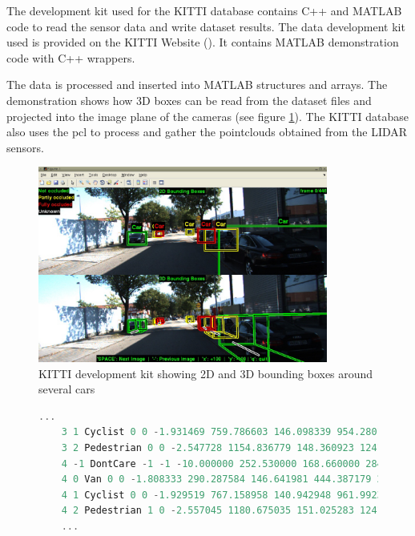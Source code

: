 The development kit used for the KITTI database contains C++ and MATLAB code to read the sensor data and write dataset results. The data development kit used is provided on the KITTI Website (\cite{KarlsruheInstituteofTechnology}). It contains MATLAB demonstration code with C++ wrappers. 

The data is processed and inserted into MATLAB structures and arrays. The demonstration shows how 3D boxes can be read from the dataset files and projected into the image plane of the cameras (see figure \ref{fig:kittidk}). The KITTI database also uses the \gls{pcl} to process and gather the pointclouds obtained from the LIDAR sensors.

\begin{figure}[htp]
	
	\centering
	\includegraphics[width=0.85\textwidth]{capstate/imgs/kittidk.png}
	
	\caption{KITTI development kit showing 2D and 3D bounding boxes around several cars}
	\label{fig:kittidk}
	
\end{figure}

\begin{figure}
\begin{center}
	\begin{lstlisting}[caption={KITTI dataset file snippet presenting frame\_id, object\_id, label, truncated and occluded flags, alpha, left top and right bottom coordinates, height, width and length, 3D coordinates (x,y,z) and rotation}, language=c++, label={lst: pop_grid}]
	...
	3 1 Cyclist 0 0 -1.931469 759.786603 146.098339 954.280160 374.000000 1.739063 0.824591 1.785241 1.821119 1.569936 5.783265 -1.642450
	3 2 Pedestrian 0 0 -2.547728 1154.836779 148.360923 1241.000000 321.627088 1.714062 0.767881 0.972283 6.463579 1.474131 7.560739 -1.860031
	4 -1 DontCare -1 -1 -10.000000 252.530000 168.660000 284.460000 202.850000 -1000.000000 -1000.000000 -1000.000000 -10.000000 -1.000000 -1.000000 -1.000000
	4 0 Van 0 0 -1.808333 290.287584 146.641981 444.387179 269.473545 2.000000 1.823255 4.433886 -4.934786 1.601945 14.098646 -2.139796
	4 1 Cyclist 0 0 -1.929519 767.158958 140.942948 961.992360 374.000000 1.739063 0.824591 1.785241 1.881359 1.534695 5.785600 -1.631447
	4 2 Pedestrian 1 0 -2.557045 1180.675035 151.025283 1241.000000 325.015204 1.714062 0.767881 0.972283 6.516488 1.497786 7.267796 -1.846627
	...	\end{lstlisting}
\end{center}
\end{figure}

